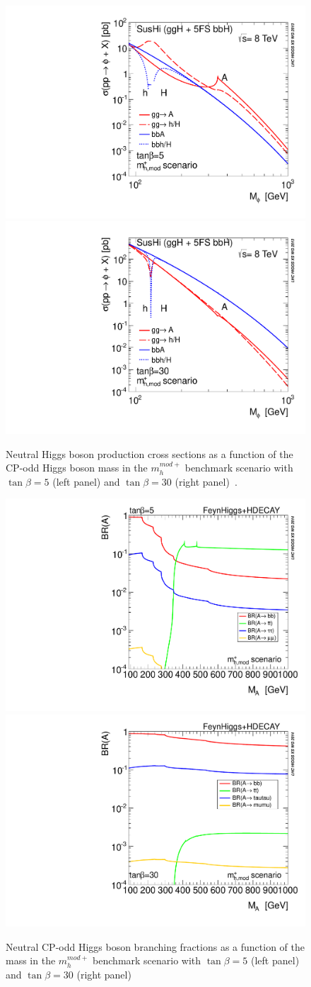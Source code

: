 \begin{figure}[h]
\centering
\includegraphics[width=0.49\columnwidth]{figures_chapter2/YR3HXS_XSectSummary_mhmodp_tanbeta5_SusHi}
\includegraphics[width=0.49\columnwidth]{figures_chapter2/YR3HXS_XSectSummary_mhmodp_tanbeta30_SusHi}
\caption{Neutral Higgs boson production cross sections as a function of the CP-odd Higgs boson mass in the $m_{h}^{mod+}$ benchmark scenario with $\tan \beta = 5$ (left panel) and $\tan \beta = 30$ (right panel)~\cite{Dittmaier:2011ti,Dittmaier:2012vm,Heinemeyer:2013tqa}.} 
\label{fig:mssm_cross}
\end{figure} 

\begin{figure}[h]
\centering
\includegraphics[width=0.49\columnwidth]{figures_chapter2/YR4HXS_BRSummary_A_mhmodp_tanbeta5_FeynHiggs_HDecay}
\includegraphics[width=0.49\columnwidth]{figures_chapter2/YR4HXS_BRSummary_A_mhmodp_tanbeta30_FeynHiggs_HDecay}
\caption{Neutral CP-odd Higgs boson branching fractions as a function of the mass in the $m_{h}^{mod+}$ benchmark scenario with $\tan \beta = 5$ (left panel) and $\tan \beta = 30$ (right panel)~\cite{Dittmaier:2011ti,Dittmaier:2012vm,Heinemeyer:2013tqa}} 
\label{fig:mssm_decay}
\end{figure} 

